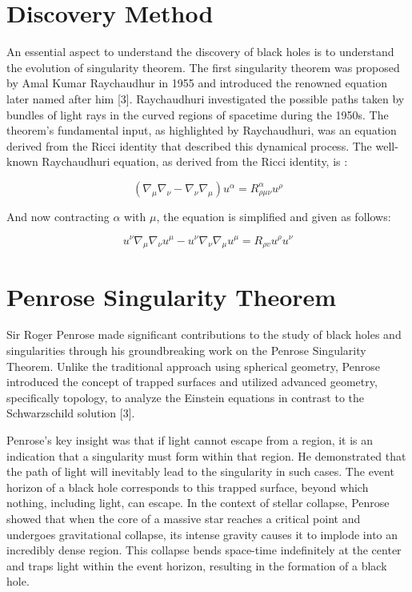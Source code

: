 \documentclass{article}
\begin{document}
\section{\Large Discovery Method}

\large 
An essential aspect to understand the discovery of black holes is to understand the evolution of singularity theorem. The first singularity theorem was proposed by Amal Kumar Raychaudhur in 1955 and introduced the renowned equation later named after him [3]. Raychaudhuri investigated the possible paths taken by bundles of light rays in the curved regions of spacetime during the 1950s. The theorem's fundamental input, as highlighted by Raychaudhuri, was an equation derived from the Ricci identity that described this dynamical process. The well-known Raychaudhuri equation, as derived from the Ricci identity, is :

$$(\nabla_{\mu} \nabla_{\nu} - \nabla_{\nu} \nabla_{\mu}) u^{\alpha} = R_{\rho \mu \nu}^{\alpha} u^{\rho}$$

And now contracting $\alpha$ with $\mu$, the equation is simplified and given as follows:

$$u^\nu \nabla_{\mu} \nabla_{\nu} u^{\mu} - u^\nu \nabla_{\nu} \nabla_{\mu} u^\mu = R_{\rho v} u^{\rho} u^\nu $$



\section{\Large Penrose Singularity Theorem}

\large
Sir Roger Penrose made significant contributions to the study of black holes and singularities through his groundbreaking work on the Penrose Singularity Theorem. Unlike the traditional approach using spherical geometry, Penrose introduced the concept of trapped surfaces and utilized advanced geometry, specifically topology, to analyze the Einstein equations in contrast to the Schwarzschild solution [3].

Penrose's key insight was that if light cannot escape from a region, it is an indication that a singularity must form within that region. He demonstrated that the path of light will inevitably lead to the singularity in such cases. The event horizon of a black hole corresponds to this trapped surface, beyond which nothing, including light, can escape.
In the context of stellar collapse, Penrose showed that when the core of a massive star reaches a critical point and undergoes gravitational collapse, its intense gravity causes it to implode into an incredibly dense region. This collapse bends space-time indefinitely at the center and traps light within the event horizon, resulting in the formation of a black hole.
\end{document}
